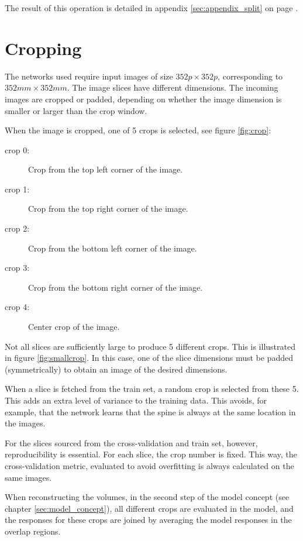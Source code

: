 The result of this operation is detailed in appendix \ref{sec:appendix_split} on page \pageref{sec:appendix_split}.

\section{Cropping}

The networks used require input images of size $352 p \times 352 p$, corresponding to $352 mm \times 352 mm$.
The image slices have different dimensions.
The incoming images are cropped or padded, depending on whether the image dimension is smaller or larger than the crop window.

When the image is cropped, one of 5 crops is selected, see figure \ref{fig:crop}:
\begin{description}
    \item[crop 0:] Crop from the top left corner of the image.
    \item[crop 1:] Crop from the top right corner of the image.
    \item[crop 2:] Crop from the bottom left corner of the image.
    \item[crop 3:] Crop from the bottom right corner of the image.
    \item[crop 4:] Center crop of the image.  
\end{description}

Not all slices are sufficiently large to produce 5 different crops. This is illustrated in figure \ref{fig:smallcrop}. In this case, one of the slice dimensions must be padded (symmetrically) to obtain an image of the desired dimensions.

When a slice is fetched from the train set, a random crop is selected from these 5.
This adds an extra level of variance to the training data. This avoids, for example, that the network learns that the spine is always at the same location in the images.

For the slices sourced from the cross-validation and train set, however, reproducibility is essential.
For each slice, the crop number is fixed.
This way, the cross-validation metric, evaluated to avoid overfitting is always calculated on the same images.

When reconstructing the volumes, in the second step of the model concept (see chapter \ref{sec:model_concept}), 
all different crops are evaluated in the model, and the responses for these crops are joined by averaging the model responses in the overlap regions.

